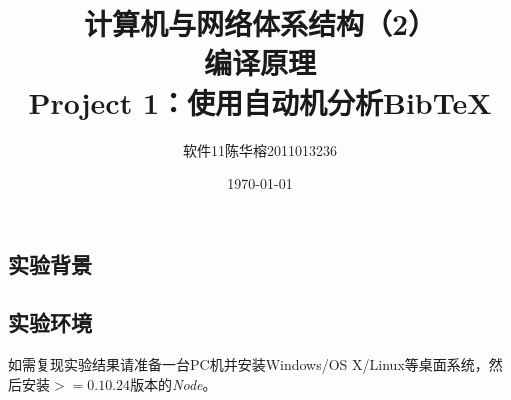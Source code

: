 \documentclass[a4paper]{article}
\begin{document}
\begin{CJK*}{UTF8}{gbsn}
    \CJKindent
    \setlength{\parindent}{2em} %
 
    \pagestyle{fancy}
  
    \title{\huge{计算机与网络体系结构（2）}\\\Large{编译原理}\\{\large Project 1：使用自动机分析Bib\TeX{}}}
    \author{软件11\hspace{10pt}陈华榕\hspace{10pt}2011013236}
    \date{\today}
    \maketitle
    \tableofcontents    
    \newpage

    \section{实验背景}
    \subsection{实验环境}
    如需复现实验结果请准备一台PC机并安装Windows/OS X/Linux等桌面系统，然后安装$>=0.10.24$版本的\textit{Node}。


\end{CJK*}
\end{document}
